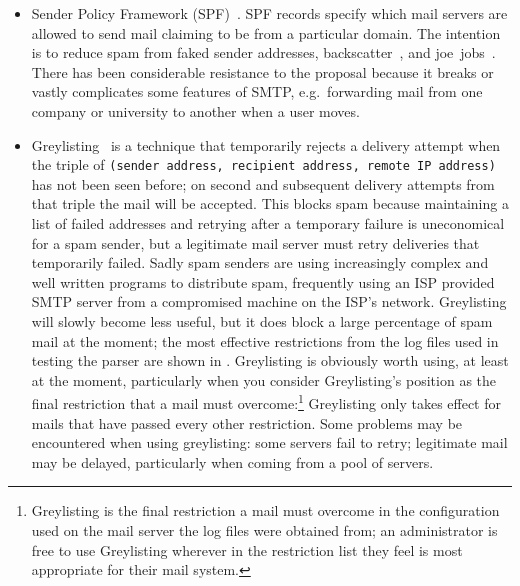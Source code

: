 \begin{itemize}

    \item Sender Policy Framework (SPF)~\cite{openspf}.  SPF\label{spf
        introduction} records specify which mail servers are allowed to
        send mail claiming to be from a particular domain.  The intention
        is to reduce spam from faked sender addresses,
        backscatter~\cite{postfix-backscatter}, and
        joe~jobs~\cite{Wikipedia-joe-job}.  There has been
        considerable resistance to the proposal because it breaks or vastly
        complicates some features of \gls{SMTP}, e.g.\ forwarding mail from
        one company or university to another when a user moves.

    \item Greylisting~\cite{greylisting} is a technique that temporarily
        rejects a delivery attempt when the triple of \newline{}
        \tab{}\texttt{(sender address, recipient address, remote \gls{IP}
        address)}\newline{} has not been seen before; on second and
        subsequent delivery attempts from that triple the mail will be
        accepted.  This blocks spam because maintaining a list of failed
        addresses and retrying after a temporary failure is uneconomical
        for a spam sender, but a legitimate mail server must retry
        deliveries that temporarily failed.  Sadly spam senders are using
        increasingly complex and well written programs to distribute spam,
        frequently using an ISP provided \gls{SMTP} server from a
        compromised machine on the ISP's network.  Greylisting will slowly
        become less useful, but it does block a large percentage of spam
        mail at the moment; the most effective restrictions from the
        \numberOFlogFILES{} log files used in testing the parser are shown
        in .  Greylisting is obviously
        worth using, at least at the moment, particularly when you consider
        Greylisting's position as the final restriction that a mail must
        overcome:\footnote{Greylisting is the final restriction a mail must
        overcome in the configuration used on the mail server the log files
        were obtained from; an administrator is free to use Greylisting
        wherever in the restriction list they feel is most appropriate for
        their mail system.} Greylisting only takes effect for mails that
        have passed every other restriction.  Some problems may be
        encountered when using greylisting: some servers fail to retry;
        legitimate mail may be delayed, particularly when coming from a
        pool of servers.


\end{itemize}
